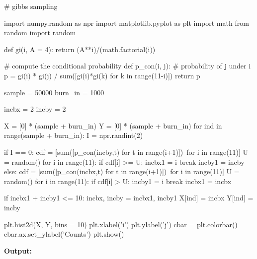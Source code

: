 \begin{python}
# gibbs sampling

import numpy.random as npr
import matplotlib.pyplot as plt
import math
from random import random

def gi(i, A = 4):
    return (A**i)/(math.factorial(i))

# compute the conditional probability
def p_con(i, j): # probability of j under i
    p = gi(i) * gi(j) / sum([gi(i)*gi(k) for k in range(11-i)])
    return p
    
sample = 50000
burn_in = 1000

incbx = 2
incby = 2

X = [0] * (sample + burn_in) 
Y = [0] * (sample + burn_in)
for ind in range(sample + burn_in):
    I = npr.randint(2)
    
    if I == 0:      
        cdf = [sum([p_con(incby,t) for t in range(i+1)])\
               for i in range(11)]
        U = random()
        for i in range(11):
            if cdf[i] >= U:
                incbx1 = i
                break
        incby1 = incby
    else:
        cdf = [sum([p_con(incbx,t) for t in range(i+1)])\
               for i in range(11)]
        U = random()
        for i in range(11):
            if cdf[i] > U:
                incby1 = i
                break
        incbx1 = incbx


    if incbx1 + incby1 <= 10:
        incbx, incby = incbx1, incby1
    X[ind] = incbx
    Y[ind] = incby
 
plt.hist2d(X, Y, bins = 10)
plt.xlabel('i')
plt.ylabel('j')
cbar = plt.colorbar()
cbar.ax.set_ylabel('Counts')
plt.show()       
\end{python}
\textbf{Output:}
